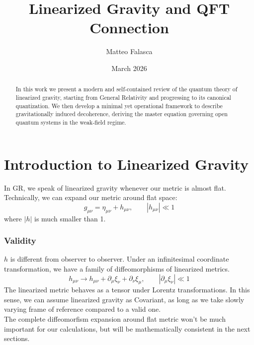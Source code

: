 \documentclass[12pt,a4paper]{article}
\title{Linearized Gravity and QFT Connection}
\author{Matteo Falasca}
\date{March 2026}
\begin{document}
\maketitle

\begin{abstract}
In this work we present a modern and self‑contained review of the quantum theory of linearized gravity, starting from General Relativity and progressing to its canonical quantization. We then develop a minimal yet operational framework to describe gravitationally induced decoherence, deriving the master equation governing open quantum systems in the weak‑field regime.\end{abstract}

\section{Introduction to Linearized Gravity}

In GR, we speak of linearized gravity whenever our metric is almost flat. Technically, we can expand our metric around flat space:
\[
g_{\mu\nu} = \eta_{\mu\nu} + h_{\mu\nu}, \qquad |h_{\mu\nu}| \ll 1
\]
where $|h|$ is much smaller than 1.

\subsubsection*{Validity}

$h$ is different from observer to observer. Under an infinitesimal coordinate transformation, we have a family of diffeomorphisms of linearized metrics.
\[
h_{\mu\nu} \to h_{\mu\nu} + \partial_\mu \xi_\nu + \partial_\nu \xi_\mu, \qquad |\partial_\mu \xi_\nu| \ll 1
\]
The linearized metric behaves as a tensor under Lorentz transformations. In this sense, we can assume linearized gravity as Covariant, as long as we take slowly varying frame of reference compared to a valid one. \\
The complete diffeomorfism expansion around flat metric won't be much important for our calculations, but will be mathematically consistent in the next sections.
\end{document}
